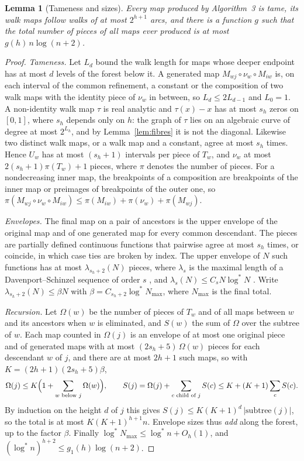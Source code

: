 \documentclass[11pt,a4paper]{article}
\theoremstyle{plain}
\newtheorem{lemma}[theorem]{Lemma}
\theoremstyle{definition}
\theoremstyle{remark}
\begin{document}
\begin{lemma}[Tameness and sizes]\label{lem:pieces}
Every map produced by Algorithm~3 is tame, its walk maps follow walks of at most $2^{h+1}$ arcs, and there is a function $g$ such that the total number of pieces of all maps ever produced is at most $g(h)\,n\log(n+2)$.
\end{lemma}
\begin{proof}
\emph{Tameness.} Let $L_d$ bound the walk length for maps whose deeper endpoint has at most $d$ levels of the forest below it. A generated map $M_{wj}\circ\nu_w\circ M_{iw}$ is, on each interval of the common refinement, a constant or the composition of two walk maps with the identity piece of $\nu_w$ in between, so $L_d\le2L_{d-1}$ and $L_0=1$. A non-identity walk map $\tau$ is real analytic and $\tau(x)-x$ has at most $s_h$ zeros on $[0,1]$, where $s_h$ depends only on $h$: the graph of $\tau$ lies on an algebraic curve of degree at most $2^{L_h}$, and by Lemma~\ref{lem:fibres} it is not the diagonal. Likewise two distinct walk maps, or a walk map and a constant, agree at most $s_h$ times. Hence $U_w$ has at most $(s_h+1)$ intervals per piece of $T_w$, and $\nu_w$ at most $2(s_h+1)\pi(T_w)+1$ pieces, where $\pi$ denotes the number of pieces. For a nondecreasing inner map, the breakpoints of a composition are breakpoints of the inner map or preimages of breakpoints of the outer one, so $\pi(M_{wj}\circ\nu_w\circ M_{iw})\le\pi(M_{iw})+\pi(\nu_w)+\pi(M_{wj})$.

\emph{Envelopes.} The final map on a pair of ancestors is the upper envelope of the original map and of one generated map for every common descendant. The pieces are partially defined continuous functions that pairwise agree at most $s_h$ times, or coincide, in which case ties are broken by index. The upper envelope of $N$ such functions has at most $\lambda_{s_h+2}(N)$ pieces, where $\lambda_s$ is the maximal length of a Davenport--Schinzel sequence of order $s$ \citep[Chapter~1]{sharir1995}, and $\lambda_s(N)\le C_sN\log^*N$ \citep{szemeredi1974}. Write $\lambda_{s_h+2}(N)\le\beta N$ with $\beta=C_{s_h+2}\log^*N_{\max}$, where $N_{\max}$ is the final total.

\emph{Recursion.} Let $\Omega(w)$ be the number of pieces of $T_w$ and of all maps between $w$ and its ancestors when $w$ is eliminated, and $S(w)$ the sum of $\Omega$ over the subtree of $w$. Each map counted in $\Omega(j)$ is an envelope of at most one original piece and of generated maps with at most $(2s_h+5)\,\Omega(w)$ pieces for each descendant $w$ of $j$, and there are at most $2h+1$ such maps, so with $K=(2h+1)(2s_h+5)\beta$,
\[
   \Omega(j)\le K\Bigl(1+\sum_{w\text{ below }j}\Omega(w)\Bigr),\qquad
   S(j)=\Omega(j)+\sum_{c\text{ child of }j}S(c)\le K+(K+1)\sum_{c}S(c).
\]
By induction on the height $d$ of $j$ this gives $S(j)\le K(K+1)^{d}\,|\mathrm{subtree}(j)|$, so the total is at most $K(K+1)^{h+1}n$. Envelope sizes thus \emph{add} along the forest, up to the factor $\beta$. Finally $\log^*N_{\max}\le\log^*n+O_h(1)$, and $(\log^*n)^{h+2}\le g_1(h)\log(n+2)$.
\end{proof}
\end{document}
